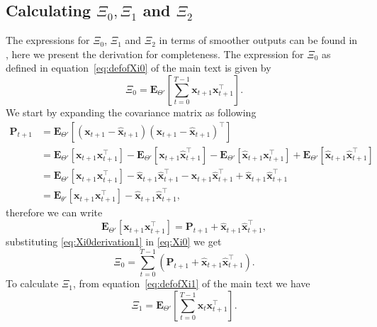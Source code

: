 \documentclass[]{article}
\begin{document}
\subsection*{Calculating $\Xi_{0}, \Xi_{1}$ and $\Xi_{2}$}
The expressions for $\Xi_{0}$, $\Xi_{1}$ and $\Xi_{2}$ in terms of smoother outputs can be found in \cite{Shumway2000}, here we present the derivation for completeness.
The expression for  $\Xi_{0}$ as defined in equation~\ref{eq:defofXi0} of the main text is given by
\begin{equation}\label{eq:Xi0}
 \Xi_0=\mathbf E_{\Theta'}\left[\sum_{t=0}^{T-1}\mathbf x_{t+1}\mathbf x_{t+1}^\top\right].
\end{equation}
We start by expanding the covariance matrix as following
\begin{align}
 \mathbf P_{t+1}&=\mathbf E_{\Theta'}\left[(\mathbf x_{t+1}-\mathbf{\hat x}_{t+1})(\mathbf x_{t+1}-\mathbf{\hat x}_{t+1})^\top\right] \nonumber \\
&=\mathbf E_{\Theta'}\left[\mathbf x_{t+1}\mathbf x_{t+1}^\top\right]-\mathbf E_{\Theta'}\left[\mathbf x_{t+1}\mathbf{\hat x}_{t+1}^\top\right]-\mathbf E_{\Theta'}\left[\mathbf{\hat x}_{t+1}\mathbf x_{t+1}^\top\right]+\mathbf E_{\Theta'}\left[\mathbf{\hat x}_{t+1}\mathbf{\hat x}_{t+1}^\top\right] \nonumber \\
&=\mathbf E_{\Theta'}\left[\mathbf x_{t+1}\mathbf x_{t+1}^\top\right]-\mathbf {\hat x}_{t+1}\mathbf{\hat x}_{t+1}^\top-\mathbf {\hat x}_{t+1}\mathbf{\hat x}_{t+1}^\top+\mathbf {\hat x}_{t+1}\mathbf{\hat x}_{t+1}^\top \nonumber \\
&=\mathbf E_{\theta'}\left[\mathbf x_{t+1}\mathbf x_{t+1}^\top\right]-\mathbf {\hat x}_{t+1}\mathbf{\hat x}_{t+1}^\top,
\end{align}
therefore we can write
\begin{equation}\label{eq:Xi0derivation1}
 \mathbf E_{\Theta'}\left[\mathbf x_{t+1}\mathbf x_{t+1}^\top\right]=\mathbf P_{t+1}+\mathbf {\hat x}_{t+1}\mathbf{\hat x}_{t+1}^\top,
\end{equation}
substituting \ref{eq:Xi0derivation1} in \ref{eq:Xi0} we get
\begin{equation}
 \Xi_0=\sum_{t=0}^{T-1}\left(\mathbf P_{t+1}+\mathbf{\hat x}_{t+1}\mathbf{\hat x}_{t+1}^\top\right).
\end{equation}
To calculate $\Xi_1$, from equation~\ref{eq:defofXi1} of the main text we have
\begin{equation}\label{eq:Xi1}
 \Xi_1=\mathbf E_{\Theta'}\left[\sum_{t=0}^{T-1}\mathbf x_t\mathbf x_{t+1}^\top\right].
\end{equation}
\end{document}
